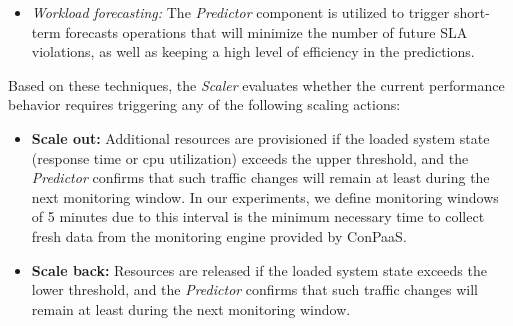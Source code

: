 \begin{itemize}
\item \emph{Workload forecasting: }  The \emph{Predictor} component is utilized to trigger short-term forecasts operations that will minimize the number of future SLA violations, as well as keeping a high level of efficiency in the predictions. 
\end{itemize}

Based on these techniques, the \emph{Scaler} evaluates whether the current performance behavior requires triggering any of the following scaling actions:

\begin{itemize}

\item \textbf{Scale out:} Additional resources are provisioned if the loaded system state (response time or cpu utilization) exceeds the upper threshold, and the \emph{Predictor} confirms that such traffic changes will remain at least during the next monitoring window. In our experiments, we define monitoring windows of 5 minutes due to this interval is the minimum necessary time to collect fresh data from the monitoring engine provided by ConPaaS. 

\item \textbf{Scale back:} Resources are released if the loaded system state exceeds the lower threshold, and the \emph{Predictor} confirms that such traffic changes will remain at least during the next monitoring window.

\end{itemize}






